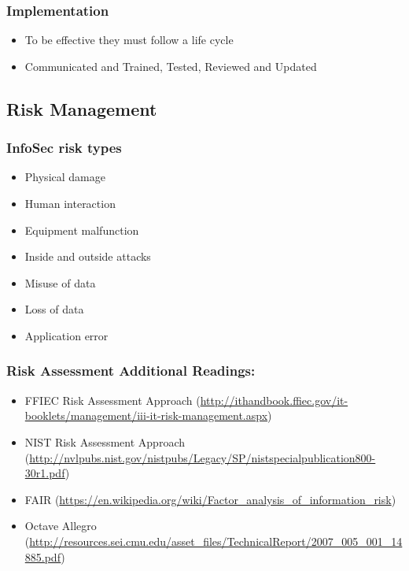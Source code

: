 \documentclass[11pt]{article}
\begin{document}
\subsubsection{Implementation}
\label{sec:org6f54bc0}
\begin{itemize}
\item To be effective they must follow a life cycle
\item Communicated and Trained, Tested, Reviewed and Updated
\end{itemize}
\subsection{Risk Management}
\label{sec:org87e951d}
\subsubsection{InfoSec risk types}
\label{sec:org2ba47b4}
\begin{itemize}
\item Physical damage
\item Human interaction
\item Equipment malfunction
\item Inside and outside attacks
\item Misuse of data
\item Loss of data
\item Application error
\end{itemize}
\subsubsection{Risk Assessment Additional Readings:}
\label{sec:org3cea35d}
\begin{itemize}
\item FFIEC Risk Assessment Approach (\url{http://ithandbook.ffiec.gov/it-booklets/management/iii-it-risk-management.aspx})

\item NIST Risk Assessment Approach (\url{http://nvlpubs.nist.gov/nistpubs/Legacy/SP/nistspecialpublication800-30r1.pdf})

\item FAIR (\url{https://en.wikipedia.org/wiki/Factor\_analysis\_of\_information\_risk})

\item Octave Allegro (\url{http://resources.sei.cmu.edu/asset\_files/TechnicalReport/2007\_005\_001\_14885.pdf})
\end{itemize}
\end{document}
